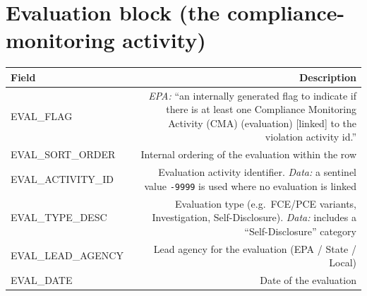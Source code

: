 \documentclass[11pt]{article}
\begin{document}
\section*{Evaluation block (the compliance-monitoring activity)}
\begin{longtable}{F D}
\toprule
Field & Description \\ \midrule \endhead
EVAL\_FLAG & \emph{EPA:} ``an internally generated flag to indicate if there is at least one Compliance
Monitoring Activity (CMA) (evaluation) [linked] to the violation activity id.'' \\
EVAL\_SORT\_ORDER & Internal ordering of the evaluation within the row \\
EVAL\_ACTIVITY\_ID & Evaluation activity identifier. \emph{Data:} a sentinel value \texttt{-9999} is used
where no evaluation is linked \\
EVAL\_TYPE\_DESC & Evaluation type (e.g.\ FCE/PCE variants, Investigation, Self-Disclosure). \emph{Data:}
includes a ``Self-Disclosure'' category \\
EVAL\_LEAD\_AGENCY & Lead agency for the evaluation (EPA / State / Local) \\
EVAL\_DATE & Date of the evaluation \\
\bottomrule
\end{longtable}
\end{document}
